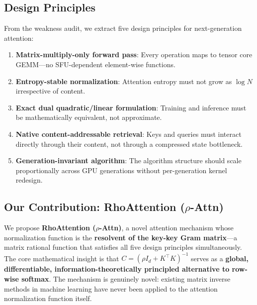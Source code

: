 \documentclass[11pt,a4paper]{article}
\theoremstyle{remark}
\begin{document}
\subsection{Design Principles}

From the weakness audit, we extract five design principles for next-generation attention:

\begin{enumerate}[label=\textbf{P\arabic*:}, leftmargin=*]
    \item \textbf{Matrix-multiply-only forward pass}: Every operation maps to tensor core GEMM---no SFU-dependent element-wise functions.
    \item \textbf{Entropy-stable normalization}: Attention entropy must not grow as $\log N$ irrespective of content.
    \item \textbf{Exact dual quadratic/linear formulation}: Training and inference must be mathematically equivalent, not approximate.
    \item \textbf{Native content-addressable retrieval}: Keys and queries must interact directly through their content, not through a compressed state bottleneck.
    \item \textbf{Generation-invariant algorithm}: The algorithm structure should scale proportionally across GPU generations without per-generation kernel redesign.
\end{enumerate}

\subsection{Our Contribution: RhoAttention ($\rho$-Attn)}

We propose \textbf{RhoAttention ($\rho$-Attn)}, a novel attention mechanism whose normalization function is the \textbf{resolvent of the key-key Gram matrix}---a matrix rational function that satisfies all five design principles simultaneously. The core mathematical insight is that $C = (\rho I_d + K^\top K)^{-1}$ serves as a \textbf{global, differentiable, information-theoretically principled alternative to row-wise softmax}. The mechanism is genuinely novel: existing matrix inverse methods in machine learning have never been applied to the attention normalization function itself.
\end{document}
